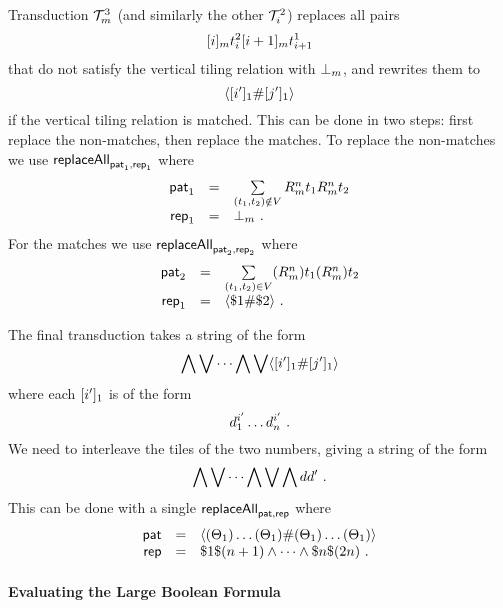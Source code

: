 Transduction $\psst^3_\expheight$ (and similarly the other $\psst^2_\idxi$)
replaces all pairs
\[
    \tenc{\expheight}{\idxi} \tile^2_\idxi
    \tenc{\expheight}{\idxi + 1} \tile^1_{\idxi+1}
\]
that do not satisfy the vertical tiling relation with $\sffalse{\expheight}$,
and rewrites them to
\[
    \lmark
        \tenc{1}{\idxi'} \spacer \tenc{1}{\idxj'}
    \rmark
\]
if the vertical tiling relation is matched. This can be done in two steps:
first replace the non-matches, then replace the matches. To replace the
non-matches we use $\replaceall_{\pat_1, \rep_1}$ where
\[
    \begin{array}{rcl}
        \pat_1 &=& \sum\limits_{\tup{\tile_1, \tile_2} \notin \vrel}
            \isnum{\expheight}{\linlen} \tile_1
            \isnum{\expheight}{\linlen} \tile_2 \\
        \rep_1 &=& \sffalse{\expheight} \ .
    \end{array}
\]
For the matches we use $\replaceall_{\pat_2, \rep_2}$ where
\[
    \begin{array}{rcl}
        \pat_2 &=& \sum\limits_{\tup{\tile_1, \tile_2} \in \vrel}
            (\isnum{\expheight}{\linlen}) \tile_1
            (\isnum{\expheight}{\linlen}) \tile_2 \\
        \rep_1 &=& \langle \$1 \spacer \$2 \rangle \ .
    \end{array}
\]

The final transduction takes a string of the form
\[
    \bigwedge \bigvee \cdots \bigwedge \bigvee \lmark
        \tenc{1}{\idxi'} \spacer \tenc{1}{\idxj'}
    \rmark
\]
where each $\tenc{1}{\idxi'}$ is of the form
\[
    \vartile^{\idxi'}_1 \ldots \vartile^{\idxi'}_\linlen \ .
\]
We need to interleave the tiles of the two numbers, giving a string of the form
\[
    \bigwedge \bigvee \cdots \bigwedge \bigvee \bigwedge \vartile \vartile' \ .
\]
This can be done with a single $\replaceall_{\pat, \rep}$ where
\[
    \begin{array}{rcl}
        \pat &=&
            \langle
                (\tilesnum{1}) \ldots (\tilesnum{1})
            \spacer
                (\tilesnum{1}) \ldots (\tilesnum{1})
            \rangle \\
        \rep &=&
            \$1 \$(\linlen + 1)
            \land \cdots \land
            \$\linlen \$(2\linlen) \ . \\
    \end{array}
\]

\paragraph{Evaluating the Large Boolean Formula}

